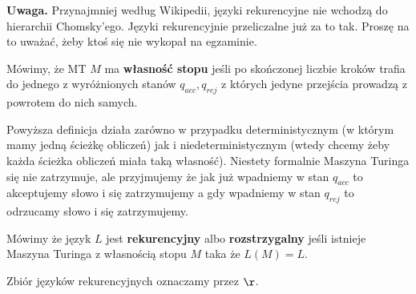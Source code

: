 \textbf{Uwaga.} Przynajmniej według Wikipedii, języki rekurencyjne nie wchodzą do hierarchii Chomsky'ego. Języki rekurencyjnie przeliczalne już za to tak. Proszę na to uważać, żeby ktoś się nie wykopał na egzaminie.

\begin{definition}
	Mówimy, że MT \( M \) ma \textbf{własność stopu} jeśli po skończonej liczbie kroków trafia do jednego z wyróżnionych stanów \( q_{acc}, q_{rej} \) z których jedyne przejścia prowadzą z powrotem do nich samych.
\end{definition}

Powyższa definicja działa zarówno w przypadku deterministycznym (w którym mamy jedną ścieżkę obliczeń) jak i niedeterministycznym (wtedy chcemy żeby każda ścieżka obliczeń miała taką własność).
Niestety formalnie Maszyna Turinga się nie zatrzymuje, ale przyjmujemy że jak już wpadniemy w stan \( q_{acc} \) to akceptujemy słowo i się zatrzymujemy a gdy wpadniemy w stan \( q_{rej} \) to odrzucamy słowo i się zatrzymujemy.

\begin{definition}
	Mówimy że język \( L \) jest \textbf{rekurencyjny} albo \textbf{rozstrzygalny} jeśli istnieje Maszyna Turinga z własnością stopu \( M \) taka że \( L(M) = L \).

	Zbiór języków rekurencyjnych oznaczamy przez \( \r \).
\end{definition}
